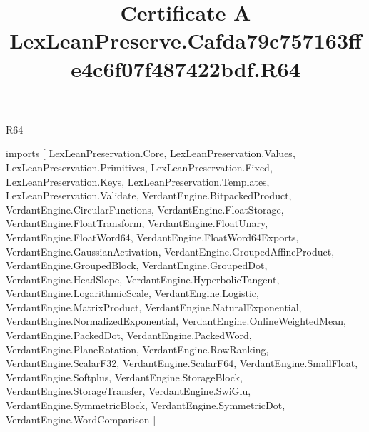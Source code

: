 \begin{lexlean}{R64}
\title{Certificate A LexLeanPreserve.Cafda79c757163ffe4c6f07f487422bdf.R64}
\begin{coremodule}
imports [
  LexLeanPreservation.Core,
  LexLeanPreservation.Values,
  LexLeanPreservation.Primitives,
  LexLeanPreservation.Fixed,
  LexLeanPreservation.Keys,
  LexLeanPreservation.Templates,
  LexLeanPreservation.Validate,
  VerdantEngine.BitpackedProduct,
  VerdantEngine.CircularFunctions,
  VerdantEngine.FloatStorage,
  VerdantEngine.FloatTransform,
  VerdantEngine.FloatUnary,
  VerdantEngine.FloatWord64,
  VerdantEngine.FloatWord64Exports,
  VerdantEngine.GaussianActivation,
  VerdantEngine.GroupedAffineProduct,
  VerdantEngine.GroupedBlock,
  VerdantEngine.GroupedDot,
  VerdantEngine.HeadSlope,
  VerdantEngine.HyperbolicTangent,
  VerdantEngine.LogarithmicScale,
  VerdantEngine.Logistic,
  VerdantEngine.MatrixProduct,
  VerdantEngine.NaturalExponential,
  VerdantEngine.NormalizedExponential,
  VerdantEngine.OnlineWeightedMean,
  VerdantEngine.PackedDot,
  VerdantEngine.PackedWord,
  VerdantEngine.PlaneRotation,
  VerdantEngine.RowRanking,
  VerdantEngine.ScalarF32,
  VerdantEngine.ScalarF64,
  VerdantEngine.SmallFloat,
  VerdantEngine.Softplus,
  VerdantEngine.StorageBlock,
  VerdantEngine.StorageTransfer,
  VerdantEngine.SwiGlu,
  VerdantEngine.SymmetricBlock,
  VerdantEngine.SymmetricDot,
  VerdantEngine.WordComparison
]


\end{coremodule}
\end{lexlean}
